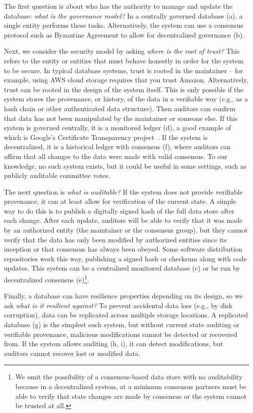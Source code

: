 {The first question is about who has the authority to manage and update the database: \emph{what is the governance model?} In a centrally governed database (a), a single entity performs these tasks. Alternatively, the system can use a consensus protocol such as Byzantine Agreement to allow for decentralized governance (b).

Next, we consider the security model by asking \emph{where is the root of trust?} This refers to the entity or entities that must behave honestly in order for the system to be secure. In typical database systems, trust is rooted in the maintainer -- for example, using AWS cloud storage requires that you trust Amazon. Alternatively, trust can be rooted in the design of the system itself. This is only possible if the system stores the provenance, or history, of the data in a verifiable way (e.g., as a hash chain or other authenticated data structure). Then auditors can confirm that data has not been manipulated by the maintainer or someone else. If this system is governed centrally, it is a monitored ledger (d), a good example of which is Google's Certificate Transparency project~\cite{CT}. If the system is decentralized, it is a historical ledger with consensus (f), where auditors can affirm that all changes to the data were made with valid consensus. To our knowledge, no such system exists, but it could be useful in some settings, such as publicly auditable committee votes. 

The next question is \emph{what is auditable?} If the system does not provide verifiable provenance, it can at least allow for verification of the current state. A simple way to do this is to publish a digitally signed hash of the full data store after each change. After each update, auditors will be able to verify that it was made by an authorized entity (the maintainer or the consensus group), but they cannot verify that the data has only been modified by authorized entities since its inception or that consensus has always been obeyed. Some software distribution repositories work this way, publishing a signed hash or checksum along with code updates. This system can be a centralized monitored database (c) or be run by decentralized consensus (e)\footnote{
	We omit the possibility of a consensus-based data store with no auditability because in a decentralized system, at a minimum consensus partners must be able to verify that state changes are made by consensus or the system cannot be trusted at all.
}. 

Finally, a database can have resilience properties depending on its design, so we ask \emph{what is it resilient against?} To prevent accidental data loss (e.g., by disk corruption), data can be replicated across multiple storage locations. A replicated database (g) is the simplest such system, but without current state auditing or verifiable provenance, malicious modifications cannot be detected or recovered from. If the system allows auditing (h, i), it can detect modifications, but auditors cannot recover lost or modified data. 

}
